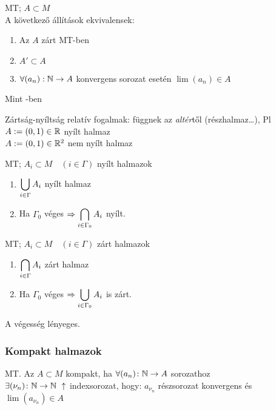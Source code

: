 \begin{te}\MT MT; $A\subset M$\\
  A következő állítások ekvivalensek:%
  \begin{enumerate}
  \item Az $A$ zárt \MT MT-ben
  \item $A'\subset A$
  \item $\forall (a_n):\mathbb{N}\to A$ konvergens sorozat esetén
    $\lim(a_n)\in A$  
  \end{enumerate}
\end{te}
\begin{biz} Mint \R-ben
\end{biz}

\begin{megj}
  Zártság-nyíltság relatív fogalmak: függnek az \emph{altér}től
  (részhalmaz\ldots), Pl\
  $A := (0,1) \in \mathbb{R}$ nyílt halmaz\\
  $A := (0,1) \in \mathbb{R}^2$ nem nyílt halmaz\\
\end{megj}

\begin{te}
  \MT MT; $A_i\subset M\quad (i\in\Gamma)$ nyílt halmazok
  \begin{enumerate}
  \item $\displaystyle\bigcup_{i\in\Gamma} A_i$ nyílt halmaz
  \item Ha $\Gamma_0$ véges $\Rightarrow \displaystyle\bigcap_{i\in\Gamma_0} A_i$ nyílt.
  \end{enumerate}
\end{te}

\begin{te}
  \MT MT; $A_i\subset M\quad (i\in\Gamma)$ zárt halmazok
  \begin{enumerate}
  \item $\displaystyle\bigcap_{i\in\Gamma} A_i$ zárt halmaz
  \item Ha $\Gamma_0$ véges $\Rightarrow \displaystyle\bigcup_{i\in\Gamma_0} A_i$ is
    zárt.
  \end{enumerate}
\end{te}

\begin{megj}A végesség lényeges.
\end{megj}

\subsubsection{Kompakt halmazok}

\begin{de}\MT MT. Az $A\subset M$ kompakt, ha $\forall (a_n)\colon
  \mathbb{N}\to A$ sorozathoz\\ $\exists (\nu_n)\colon \N\n\N\ \uparrow$
  indexsorozat, hogy: $a_{\nu_n}$ részsorozat konvergens és
  $\lim(a_{\nu_n})\in A$
\end{de}

